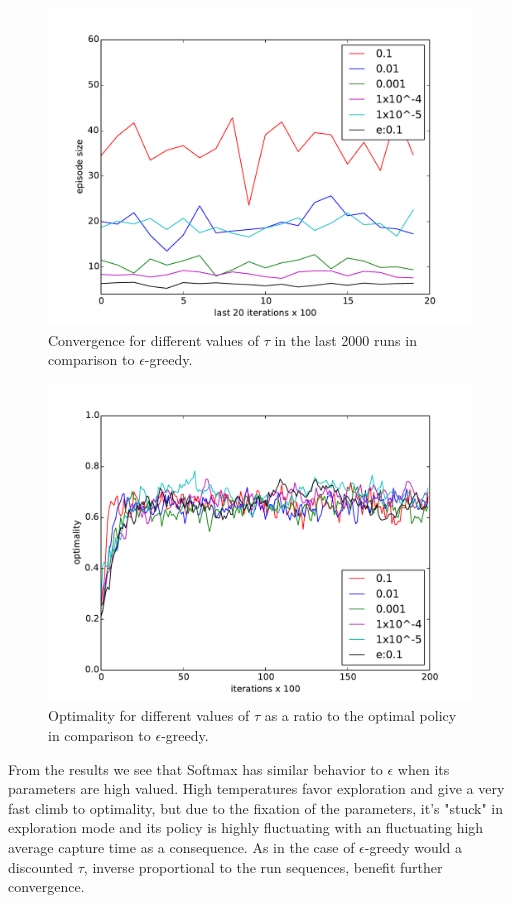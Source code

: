 \documentclass[paper=a4, fontsize=11pt]{scrartcl}
\numberwithin{equation}{section}		%
\numberwithin{figure}{section}			%
\numberwithin{table}{section}				%
\begin{document}
\begin{figure}[H] \centering
\includegraphics[scale=0.5]{softmaxlast20x100.pdf}
\caption{Convergence for different values of $\tau$ in the last 2000 runs in comparison to $\epsilon$-greedy.} 
\label{figure:softmaxlast20}
\end{figure}
\begin{figure}[H] \centering
\includegraphics[scale=0.6]{softmaxOptimality.pdf}
\caption{Optimality for different values of $\tau$ as a ratio to the optimal policy in comparison to $\epsilon$-greedy.} 
\label{figure:softmxOpti}
\end{figure}
From the results we see that Softmax has similar behavior to $\epsilon$ when its parameters are high valued. High temperatures favor exploration and give a very fast climb to optimality, but due to the fixation of the parameters, it's "stuck" in exploration mode and its policy is highly fluctuating with an fluctuating high average capture time as a consequence. As in the case of $\epsilon$-greedy would a discounted $\tau$, inverse proportional to the run sequences, benefit further convergence.
\end{document}
